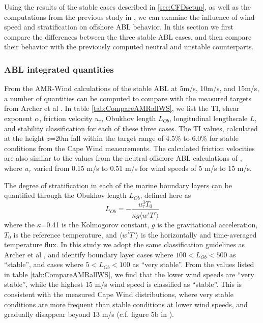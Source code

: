 Using the results of the stable cases described in \ref{sec:CFDsetup},
as well as the computations from the previous study in
\cite{cheung2020large}, we can examine the influence of wind speed and
stratification on offshore ABL behavior.  In this section we first
compare the differences between the three stable ABL cases, and then
compare their behavior with the previously computed neutral and
unstable counterparts.

\subsubsection{\label{sec:stableABLStats} ABL integrated quantities}
From the AMR-Wind calculations of the stable ABL at 5m/s, 10m/s, and
15m/s, a number of quantities can be computed to compare with the
measured targets from Archer et al \cite{archer2016predominance}.  In
table \ref{tab:CompareAMRallWS}, we list the TI, shear exponent
$\alpha$, friction velocity $u_\tau$, Obukhov length $L_{Ob}$,
longitudinal lengthscale $L$, and stability classification for each of
these three cases.  The TI values, calculated at the height $z$=20m
fall within the target range of 4.5\% to 6.0\% for stable conditions
from the Cape Wind measurements.  The calculated friction velocities
are also similar to the values from the neutral offshore ABL
calculations of \cite{cheung2020large}, where $u_\tau$ varied from
0.15 m/s to 0.51 m/s for wind speeds of 5 m/s to 15 m/s.

The degree of stratification in each of the marine boundary layers can
be quantified through the Obukhov length $L_{Ob}$, defined here as 
\begin{equation}
  L_{Ob} = -\frac{u_\tau^3 T_0}{\kappa g \langle \overline{w'T'} \rangle}
\end{equation}
where the $\kappa$=0.41 is the Kolmogorov constant, $g$ is the
gravitational acceleration, $T_0$ is the reference temperature, and
$\langle \overline{w'T'} \rangle$ is the horizontally and
time-averaged temperature flux.  In this study we adopt the same
classification guidelines as Archer et al
\cite{archer2016predominance}, and identify boundary layer cases where
$100 < L_{Ob} < 500$ as ``stable'', and cases where $5 < L_{Ob}<100$
as ``very stable''.  From the values listed in table
\ref{tab:CompareAMRallWS}, we find that the lower wind speeds are
``very stable'', while the highest 15 m/s wind speed is classified as
``stable''.  This is consistent with the measured Cape Wind
distributions, where very stable conditions are more frequent than
stable conditions at lower wind speeds, and gradually disappear beyond
13 m/s (c.f. figure 5b in \cite{archer2016predominance}).

